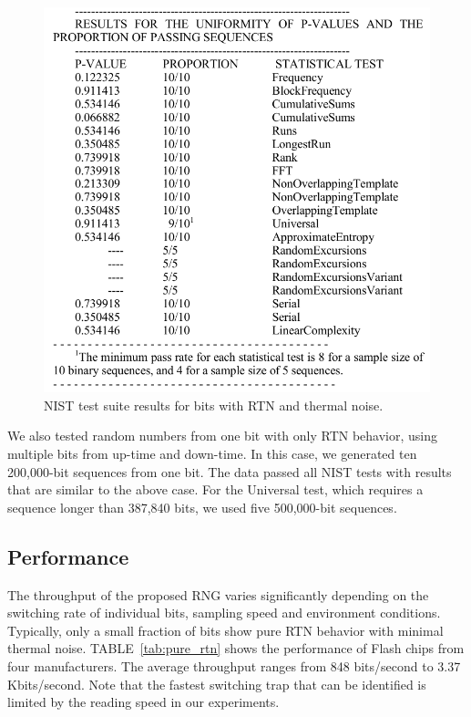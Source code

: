 \begin{figure}
\begin{center} 
\includegraphics[width=5in]{figs/nist_result.png} 
\caption{NIST test suite results for bits with RTN and thermal noise.}
\label{fig:nist_result} 
\vspace{-0.1in}
\end{center} 
\end{figure} 

We also tested random numbers from one bit with only RTN behavior, using multiple bits from up-time and down-time. In this case, we generated ten 200,000-bit sequences from one bit. The data passed all NIST tests with results that are similar to the above case. For the Universal test, which requires a sequence longer than 387,840 bits, we used five 500,000-bit sequences. 

\subsection{Performance}

The throughput of the proposed RNG varies significantly depending on the switching rate of individual bits, sampling speed and environment conditions. Typically, only a small fraction of bits show pure RTN behavior with minimal thermal noise. TABLE~\ref{tab:pure_rtn} shows the performance of Flash chips from four manufacturers. The average throughput ranges from 848 bits/second to 3.37 Kbits/second. Note that the fastest switching trap that can be identified is limited by the reading speed in our experiments.


